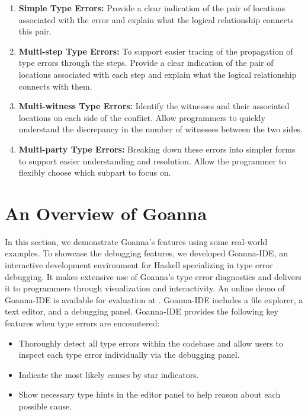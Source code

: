 \documentclass[pdflatex,lineno,sn-nature,Numbered]{sn-jnl}%
\begin{document}
\begin{enumerate}
  \item {
    \textbf{Simple Type Errors:}  Provide a clear indication of the pair of locations associated with the error and explain what the logical relationship connects this pair.
  }
  
  \item {
    \textbf{Multi-step Type Errors:} To support easier tracing of the propagation of type errors through the steps. Provide a clear indication of the pair of locations associated with each step and explain what the logical relationship connects with them.
  }
  \item {
    \textbf{Multi-witness Type Errors:} Identify the witnesses and their associated locations on each side of the conflict. Allow programmers to quickly understand the discrepancy in the number of witnesses between the two sides.
  }
  \item {
    \textbf{Multi-party Type Errors:} Breaking down these errors into simpler forms to support easier understanding and resolution. Allow the programmer to flexibly choose which subpart to focus on.
  }
\end{enumerate}



\section{An Overview of Goanna} \label{sec:walkthrough}
In this section, we demonstrate Goanna's features using some real-world examples. To showcase the debugging features,  we developed Goanna-IDE, an interactive development environment for Haskell specializing in type error debugging. It makes extensive use of Goanna's type error diagnostics and delivers it to programmers through visualization and interactivity. An online demo of Goanna-IDE is available for evaluation at \cite{Fu2023-bo}. Goanna-IDE includes a file explorer, a text editor, and a debugging panel. Goanna-IDE provides the following key features when type errors are encountered:

    \begin{itemize}
        \item Thoroughly detect all type errors within the codebase and allow users to inspect each type error individually via the debugging panel.
        \item Indicate the most likely causes by star indicators.
        \item Show necessary type hints in the editor panel to help reason about each possible cause.
    \end{itemize}
\end{document}
